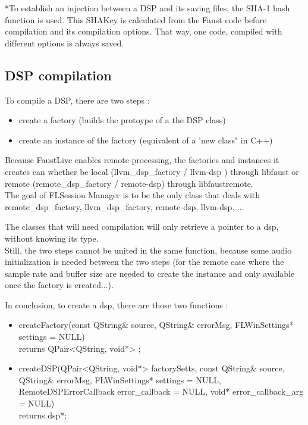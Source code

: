 \documentclass[a4paper]{article}
\begin{document}
*To establish an injection between a DSP and its saving files, the SHA-1 hash function is used. This SHAKey is calculated from the Faust code before compilation and its compilation options. That way, one code, compiled with different options is always saved. 

\subsection{DSP compilation}

To compile a DSP, there are two steps :
\begin{itemize}
\item create a factory (builds the protoype of a the DSP class)
\item create an instance of the factory (equivalent of a 'new class" in C++)
\end{itemize}

Because FaustLive enables remote processing, the factories and instances it creates can whether be local (llvm\_dsp\_factory / llvm-dsp ) through libfaust or remote (remote\_dsp\_factory / remote-dsp) through libfaustremote. \\

The goal of FLSession Manager is to be the only class that deals with remote\_dsp\_factory, llvm\_dsp\_factory, remote-dsp, llvm-dsp, ...

The classes that will need compilation will only retrieve a pointer to a dsp, without knowing its type. \\

Still, the two steps cannot be united in the same function, because some audio initialization is needed between the two steps (for the remote case where the sample rate and buffer size are needed to create the instance and only available once the factory is created...).

In conclusion, to create a dsp, there are those two functions :
\begin{itemize}
\item createFactory(const QString\& source, QString\& errorMsg, FLWinSettings* settings = NULL) \\ returns QPair<QString, void*> ;
\item createDSP(QPair<QString, void*> factorySetts, const QString\& source, QString\& errorMsg, FLWinSettings* settings = NULL, RemoteDSPErrorCallback error\_callback = NULL, void* error\_callback\_arg = NULL) \\ returns dsp*;
\end{itemize}
\end{document}
